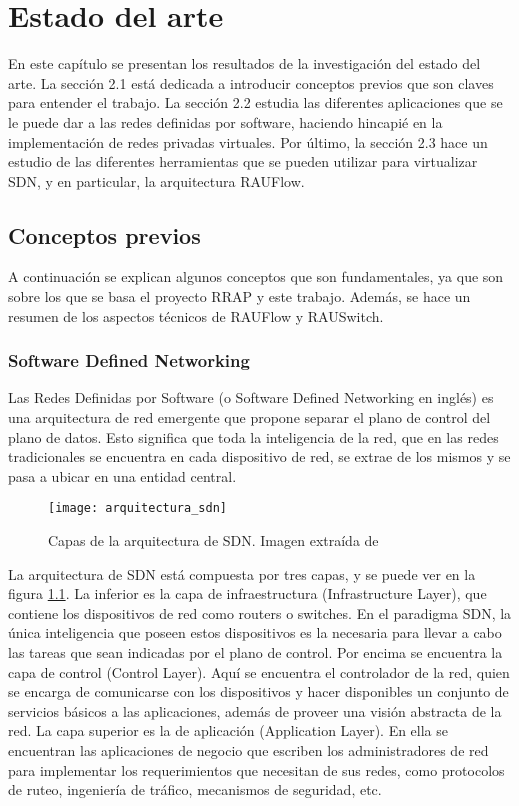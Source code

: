 \graphicspath{{Chapter2/Figs/}}

\chapter{Estado del arte}
En este capítulo se presentan los resultados de la investigación del estado del arte. La sección 2.1 está dedicada a introducir conceptos previos que son claves para entender el trabajo. La sección 2.2 estudia las diferentes aplicaciones que se le puede dar a las redes definidas por software, haciendo hincapié en la implementación de redes privadas virtuales. Por último, la sección 2.3 hace un estudio de las diferentes herramientas que se pueden utilizar para virtualizar SDN, y en particular, la arquitectura RAUFlow.

\section{Conceptos previos}
A continuación se explican algunos conceptos que son fundamentales, ya que son sobre los que se basa el proyecto RRAP \cite{proyecto-rrap} y este trabajo. Además, se hace un resumen de los aspectos técnicos de RAUFlow y RAUSwitch.

\subsection{Software Defined Networking}
Las Redes Definidas por Software (o Software Defined Networking en inglés) es una arquitectura de red emergente que propone separar el plano de control del plano de datos. Esto significa que toda la inteligencia de la red, que en las redes tradicionales se encuentra en cada dispositivo de red, se extrae de los mismos y se pasa a ubicar en una entidad central.

\begin{figure}[h] 
	\centering    
	\texttt{[image: arquitectura\_sdn]}
	\caption{Capas de la arquitectura de SDN. Imagen extraída de \cite{onf-def-sdn}}
	\label{fig:arquitectura_sdn}
\end{figure}

La arquitectura de SDN está compuesta por tres capas, y se puede ver en la figura \ref{fig:arquitectura_sdn}. La inferior es la capa de infraestructura (Infrastructure Layer), que contiene los dispositivos de red como routers o switches. En el paradigma SDN, la única inteligencia que poseen estos dispositivos es la necesaria para llevar a cabo las tareas que sean indicadas por el plano de control. Por encima se encuentra la capa de control (Control Layer). Aquí se encuentra el controlador de la red, quien se encarga de comunicarse con los dispositivos y hacer disponibles un conjunto de servicios básicos a las aplicaciones, además de proveer una visión abstracta de la red. La capa superior es la de aplicación (Application Layer). En ella se encuentran las aplicaciones de negocio que escriben los administradores de red para implementar los requerimientos que necesitan de sus redes, como protocolos de ruteo, ingeniería de tráfico, mecanismos de seguridad, etc.

